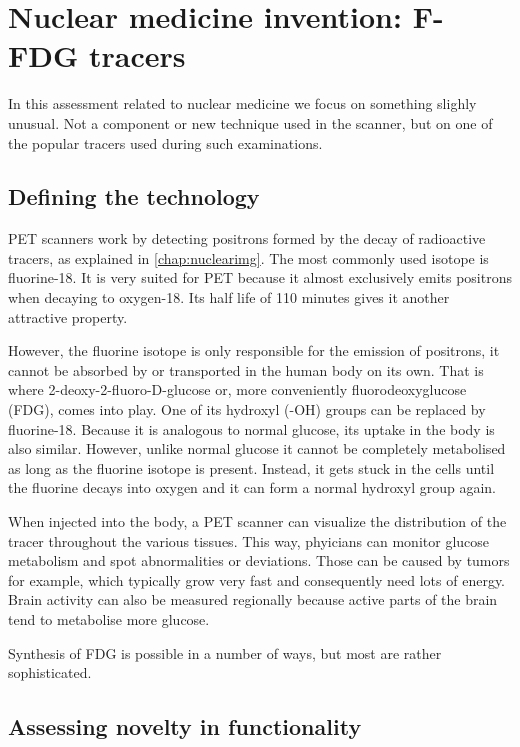 \section{Nuclear medicine invention: F-FDG tracers}
In this assessment related to nuclear medicine we focus on something slighly
unusual. Not a component or new technique used in the scanner, but on one of the
popular tracers used during such examinations.

\subsection{Defining the technology}
PET scanners work by detecting positrons formed by the decay of radioactive
tracers, as explained in \autoref{chap:nuclearimg}. The most commonly used
isotope is fluorine-18. It is very suited for PET because it almost exclusively
emits positrons when decaying to oxygen-18. Its half life of 110 minutes gives
it another attractive property.

However, the fluorine isotope is only responsible for the emission of positrons,
it cannot be absorbed by or transported in the human body on its own. That is
where 2-deoxy-2-fluoro-D-glucose or, more conveniently fluorodeoxyglucose (FDG),
comes into play. One of its hydroxyl (-OH) groups can be replaced by
fluorine-18. Because it is analogous to normal glucose, its uptake in the body
is also similar. However, unlike normal glucose it cannot be completely
metabolised as long as the fluorine isotope is present. Instead, it gets stuck
in the cells until the fluorine decays into oxygen and it can form a normal
hydroxyl group again.

When injected into the body, a PET scanner can visualize the distribution of the
tracer throughout the various tissues. This way, phyicians can monitor glucose
metabolism and spot abnormalities or deviations. Those can be caused by tumors
for example, which typically grow very fast and consequently need lots of
energy. Brain activity can also be measured regionally because active parts of
the brain tend to metabolise more glucose.

Synthesis of FDG is possible in a number of ways, but most are rather
sophisticated. 



\subsection{Assessing novelty in functionality}

